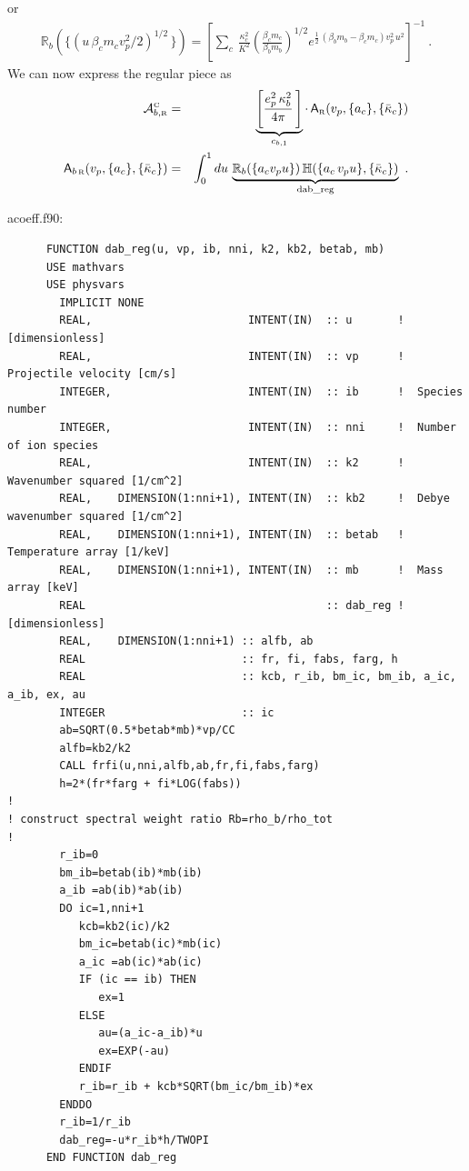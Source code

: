 \documentclass[preprint,12pt,eqsecnum,nofootinbib,amsmath,amssymb]{revtex4}
\newcommand{\smC}{{\rm\scriptscriptstyle C}}
\newcommand{\smR}{{\rm\scriptscriptstyle R}}
\begin{document}
or
\begin{eqnarray}
  \mathbb{R}_b(\{ (u\,\beta_c m_c v_p^2/2)^{1/2}\, \}) 
  =
  \left[
  {\sum}_c \, \frac{\kappa_c^2}{K^2} 
  \left(\frac{\beta_c m_c}{\beta_b m_b}\right)^{1/2} 
  e^{\frac{1}{2}\,(\beta_b m_b-\beta_c m_c) v_p^2\, u^2}
  \right]^{-1} \ .
\end{eqnarray}
We can now express the regular piece as
\begin{eqnarray}
  {\cal A}^\smC_{b,\smR}
  &=& 
  \underbrace{
  \left[
  \frac{e_p^2\, \kappa_b^2}{4\pi}\,
  \right] 
  }_{c_{b,1}}
  \cdot \,
  {\sf A}_\smR(v_p,\{a_c\},\{\bar\kappa_c\})
\\
  {\sf A}_{b\,\smR}(v_p,\{a_c\},\{\bar\kappa_c\})
  &=&
  \int_0^1 du\, 
  \underbrace{
  \mathbb{R}_b(\{a_c v_p u\})\,
  \mathbb{H}(\{a_c\,v_p u\},\{\bar\kappa_c\})  
  }_{\rm dab\_reg}
  \ .
\end{eqnarray}

\vskip0.4cm
\noindent
acoeff.f90:
{
\baselineskip 10pt
\begin{verbatim}
      FUNCTION dab_reg(u, vp, ib, nni, k2, kb2, betab, mb)
      USE mathvars
      USE physvars
        IMPLICIT NONE
        REAL,                        INTENT(IN)  :: u       !  [dimensionless]
        REAL,                        INTENT(IN)  :: vp      !  Projectile velocity [cm/s]
        INTEGER,                     INTENT(IN)  :: ib      !  Species number
        INTEGER,                     INTENT(IN)  :: nni     !  Number of ion species
        REAL,                        INTENT(IN)  :: k2      !  Wavenumber squared [1/cm^2]
        REAL,    DIMENSION(1:nni+1), INTENT(IN)  :: kb2     !  Debye wavenumber squared [1/cm^2]
        REAL,    DIMENSION(1:nni+1), INTENT(IN)  :: betab   !  Temperature array [1/keV]
        REAL,    DIMENSION(1:nni+1), INTENT(IN)  :: mb      !  Mass array [keV]
        REAL                                     :: dab_reg !  [dimensionless]
        REAL,    DIMENSION(1:nni+1) :: alfb, ab
        REAL                        :: fr, fi, fabs, farg, h
        REAL                        :: kcb, r_ib, bm_ic, bm_ib, a_ic, a_ib, ex, au
        INTEGER                     :: ic
        ab=SQRT(0.5*betab*mb)*vp/CC
        alfb=kb2/k2
        CALL frfi(u,nni,alfb,ab,fr,fi,fabs,farg)
        h=2*(fr*farg + fi*LOG(fabs))
!
! construct spectral weight ratio Rb=rho_b/rho_tot
!
        r_ib=0
        bm_ib=betab(ib)*mb(ib)
        a_ib =ab(ib)*ab(ib)
        DO ic=1,nni+1
           kcb=kb2(ic)/k2
           bm_ic=betab(ic)*mb(ic)
           a_ic =ab(ic)*ab(ic)
           IF (ic == ib) THEN
              ex=1
           ELSE
              au=(a_ic-a_ib)*u
              ex=EXP(-au)
           ENDIF
           r_ib=r_ib + kcb*SQRT(bm_ic/bm_ib)*ex
        ENDDO      
        r_ib=1/r_ib
        dab_reg=-u*r_ib*h/TWOPI
      END FUNCTION dab_reg
\end{verbatim}
}
\end{document}
